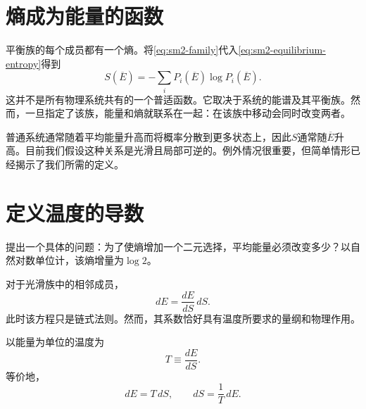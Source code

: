 \begin{classroomqa}
\end{classroomqa}

\begin{classroomqa}
\end{classroomqa}

\section{熵成为能量的函数}

平衡族的每个成员都有一个熵。将\eqref{eq:sm2-family}代入\eqref{eq:sm2-equilibrium-entropy}得到
\begin{equation}
 S(\overline E)
 =-\sum_iP_i(\overline E)\log P_i(\overline E).
 \label{eq:sm2-entropy-energy}
\end{equation}
这并不是所有物理系统共有的一个普适函数。它取决于系统的能谱及其平衡族。然而，一旦指定了该族，能量和熵就联系在一起：在该族中移动会同时改变两者。

普通系统通常随着平均能量升高而将概率分散到更多状态上，因此\(S\)通常随\(\overline E\)升高。目前我们假设这种关系是光滑且局部可逆的。例外情况很重要，但简单情形已经揭示了我们所需的定义。

\section{定义温度的导数}

提出一个具体的问题：为了使熵增加一个二元选择，平均能量必须改变多少？以自然对数单位计，该熵增量为\(\log2\)。

对于光滑族中的相邻成员，
\begin{equation}
 dE=\frac{dE}{dS}\,dS.
 \label{eq:sm2-differential-identity}
\end{equation}
此时该方程只是链式法则。然而，其系数恰好具有温度所要求的量纲和物理作用。

\begin{definition}
以能量为单位的温度为
\begin{equation}
 T\equiv\frac{dE}{dS}.
 \label{eq:sm2-temperature-definition}
\end{equation}
等价地，
\begin{equation}
 dE=T\,dS,
 \qquad
 dS=\frac{1}{T}\,dE.
 \label{eq:sm2-fundamental-differentials}
\end{equation}
\end{definition}

